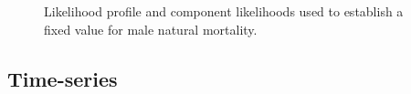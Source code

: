 \documentclass[
]{scrartcl}
\begin{document}
\begin{figure}[H]


\caption{\label{fig-M-profile-explore}Likelihood profile and component
likelihoods used to establish a fixed value for male natural mortality.}

\end{figure}%

\newpage

\subsection{Time-series}\label{time-series}
\end{document}
